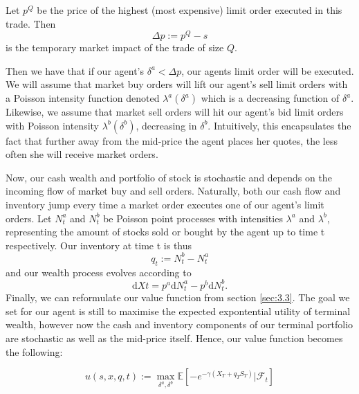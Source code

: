 \begin{definition}
    Let $p^Q$ be the price of the highest (most expensive) limit order 
    executed in this trade. Then 
    \begin{equation}
        \Delta p:=p^Q-s
    \end{equation}
    is the temporary market impact of the trade of size $Q.$ 
\end{definition}

Then we have that if our agent's $\delta^a < \Delta p$, our agents 
limit order will be executed. We will assume that market buy orders
will lift our agent's sell limit orders with a Poisson intensity function
denoted $\lambda^a(\delta^a)$ which is a decreasing function of $\delta^a$.
Likewise, we assume that market sell orders will hit our agent's bid 
limit orders with Poisson intensity $\lambda^b(\delta^b)$, decreasing
in $\delta^b$. Intuitively, this encapsulates the fact that further 
away from the mid-price the agent places her quotes, the less often she
will receive market orders.

Now, our cash wealth and portfolio of stock is stochastic and depends
on the incoming flow of market buy and sell orders. Naturally, both
our cash flow and inventory jump every time a market order executes 
one of our agent's limit orders. Let $N^a_t$ and $N^b_t$ be Poisson 
point processes with intensities $\lambda^a$ and $\lambda^b$, 
representing the amount of stocks sold or bought by the agent up to 
time t respectively. Our inventory at time t is thus 
\begin{equation}
    q_t:=N^b_t-N^a_t
\end{equation} 
and our wealth process evolves according to
\begin{equation}
    \mathrm dXt=p^a\mathrm dN^a_t-p^b\mathrm dN^b_t.
\end{equation}
Finally, we can reformulate our value function from section \ref{sec:3.3}.
The goal we set for our agent is still to maximise the expected 
expontential utility of terminal wealth, however now the cash and 
inventory components of our terminal portfolio are stochastic as 
well as the mid-price itself. Hence, our value function becomes 
the following:
\begin{definition}
    \begin{equation}\label{eq:3.12}
        u(s,x,q,t):=\max\limits_{\delta^a,\delta^b}\mathbb{E}\left[-e^{-\gamma(X_T+q_TS_T)}|\mathcal{F}_t\right]
    \end{equation}
\end{definition}

